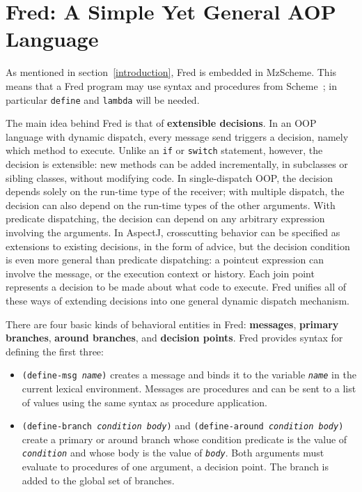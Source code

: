 \documentclass{article}
\newcommand{\defn}[1]{\textbf{#1}}
\newcommand{\code}[1]{\texttt{#1}}
\newcommand{\parm}[1]{\code{\textit{#1}}}
\begin{document}
\section{Fred: A Simple Yet General AOP Language}
\label{Fred}

As mentioned in section~\ref{introduction}, Fred is embedded in
MzScheme.  This means that a Fred program may use syntax and
procedures from Scheme~\cite{R5RS}; in particular \code{define}
and \code{lambda} will be needed.

The main idea behind Fred is that of \defn{extensible decisions}.  In
an OOP language with dynamic dispatch, every message send triggers a
decision, namely which method to execute.  Unlike an \code{if} or
\code{switch} statement, however, the decision is extensible: new
methods can be added incrementally, in subclasses or sibling classes,
without modifying code.  In single-dispatch OOP, the decision depends
solely on the run-time type of the receiver; with multiple dispatch,
the decision can also depend on the run-time types of the other
arguments.  With predicate dispatching, the decision can depend on any
arbitrary expression involving the arguments.  In AspectJ,
crosscutting behavior can be specified as extensions to existing
decisions, in the form of advice, but the decision condition is even
more general than predicate dispatching: a pointcut expression can
involve the message, or the execution context or history.  Each join
point represents a decision to be made about what code to execute.
Fred unifies all of these ways of extending decisions into one general
dynamic dispatch mechanism.

There are four basic kinds of behavioral entities in Fred:
\defn{messages}, \defn{primary branches}, \defn{around branches}, and
\defn{decision points}.  Fred provides syntax for defining the first three:

\begin{itemize}
\item \code{(define-msg \parm{name})}
      creates a message and binds it to the variable \parm{name} in
      the current lexical environment.  Messages are procedures and
      can be sent to a list of values using the same syntax as
      procedure application.
\item \code{(define-branch \parm{condition} \parm{body})} and
      \code{(define-around \parm{condition} \parm{body})} create a
      primary or around branch whose condition predicate is the value
      of \parm{condition} and whose body is the value of \parm{body}.
      Both arguments must evaluate to procedures of one argument, a
      decision point.  The branch is added to the global set of
      branches.
\end{itemize}
\end{document}
